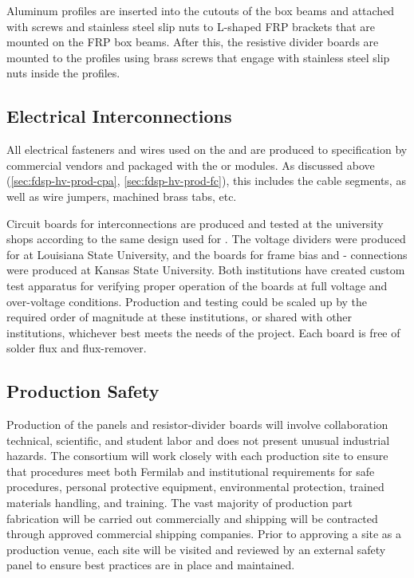 Aluminum profiles are inserted into the cutouts of the box beams and attached with screws and stainless steel slip nuts to L-shaped FRP brackets that are mounted on the 
FRP box beams. After this, the resistive divider boards are mounted to the profiles using brass screws that engage with stainless steel slip nuts inside 
the profiles.

\subsection{Electrical Interconnections}
\label{sec:fdsp-hv-prod-interconnect}

All electrical fasteners and wires used on the  and  are produced
to specification by commercial vendors and packaged with the  or  modules.  
As discussed above (\ref{sec:fdsp-hv-prod-cpa}, \ref{sec:fdsp-hv-prod-fc}), 
this includes the  cable segments, as well as wire jumpers, machined brass
tabs, etc.

Circuit boards for %
 interconnections are produced and tested at the  university shops according to the same design used for .  The  voltage dividers were produced for  at Louisiana State University, and the boards for  frame bias and - connections were produced at Kansas State University.
Both institutions have created custom test apparatus for verifying proper operation of the boards at full voltage and over-voltage conditions.  Production and testing could be scaled up by the required order of magnitude at these institutions, or shared with other institutions, whichever best meets the needs of the project. Each board is free of solder flux and flux-remover. 

\subsection{Production Safety}
\label{sec:fdsp-hv-prod-safety}

Production of the  panels and resistor-divider boards will involve collaboration technical, scientific, and student labor and  does not present unusual industrial hazards. The  consortium will work closely with each production site to ensure that procedures meet both Fermilab and institutional requirements for safe procedures, personal protective equipment, environmental protection, trained materials handling, and training. The vast majority of production part fabrication will be carried out commercially and shipping will be contracted through approved commercial shipping companies. Prior to approving a site as a production venue, each site will be visited and reviewed by an external safety panel to ensure best practices are in place and maintained. 

